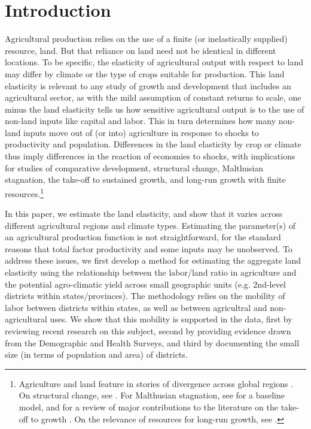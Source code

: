 \documentclass[12pt]{article}
\begin{document}
\pagebreak 

\section{Introduction}
\doublespacing 
Agricultural production relies on the use of a finite (or inelastically supplied) resource, land. But that reliance on land need not be identical in different locations. To be specific, the elasticity of agricultural output with respect to land may differ by climate or the type of crops suitable for production. This land elasticity is relevant to any study of growth and development that includes an agricultural sector, as with the mild assumption of constant returns to scale, one minus the land elasticity tells us how sensitive agricultural output is to the use of non-land inputs like capital and labor. This in turn determines how many non-land inputs move out of (or into) agriculture in response to shocks to productivity and population. Differences in the land elasticity by crop or climate thus imply differences in the reaction of economies to shocks, with implications for studies of comparative development, structural change, Malthusian stagnation, the take-off to sustained growth, and long-run growth with finite resources.\footnote{Agriculture and land feature in stories of divergence across global regions \citep{kp2001,galor2008trading,vollrath2011,vv08,vv13,cs2015}. On structural change, see \cite{Gollin:2007oq,Restuccia:2008hc,weilwilde2009,Gollin:2010ys,ev2016clim}. For Malthusian stagnation, see \cite{ashraf2010dynamics} for a baseline model, and \citet{Galor:2011uq} for a review of major contributions to the literature on the take-off to growth \citep{gw00,galor2002natural,Hansen:2002fk,doepke2004accounting,cs2005,lagerlof2006,craftsmills2009,strulik2008population}. On the relevance of resources for long-run growth, see \cite{perettovalente2015}.} 

In this paper, we estimate the land elasticity, and show that it varies across different agricultural regions and climate types. Estimating the parameter(s) of an agricultural production function is not straightforward, for the standard reasons that total factor productivity and some inputs may be unobserved. To address these issues, we first develop a method for estimating the aggregate land elasticity using the relationship between the labor/land ratio in agriculture and the potential agro-climatic yield across small geographic units (e.g. 2nd-level districts within states/provinces). The methodology relies on the mobility of labor between districts within states, as well as between agricultral and non-agricultural uses. We show that this mobility is supported in the data, first by reviewing recent research on this subject, second by providing evidence drawn from the Demographic and Health Surveys, and third by documenting the small size (in terms of population and area) of districts.
\end{document}
